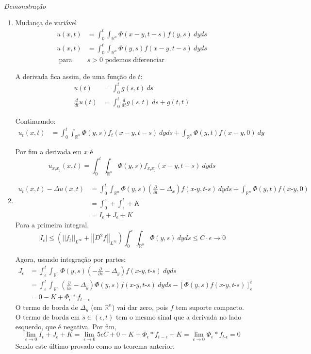 \documentclass[11pt]{article}
\newcommand{\Rn}{{\mathbb{R}^n}}
\newcommand{\p}{\partial}
\newcommand{\e}{\epsilon}
\newcommand{\pde}[2]{\frac{\p #1}{\p #2}}
\newcommand{\mi}{\text{-}}
\newcommand{\norm}[2]{\left|\left|#1\right|\right|_{L^{#2}}}
\begin{document}
\textit{Demonstração}\begin{enumerate}
	\item Mudança de variável \begin{align*}
		u(x,t)&=\int_0^t \int_\Rn \Phi(x-y,t-s) f(y,s)\ dy ds \\
		u(x,t)&=\int_0^t \int_\Rn \Phi(y,s) f(x-y,t-s)\ dy ds \\
		\text{ para } &s>0 \text{ podemos diferenciar }
	\end{align*}

	A derivada fica assim, de uma função de \(t\): \begin{align*}
		u(t) &= \int_0^t g(s,t)\ ds \\
		\frac{d}{dt}u(t) &= \int_0^t \frac{d}{dt}g(s,t)\ ds + g(t,t)
	\end{align*}

	Continuando: \begin{align*}
		u_t(x,t)&=\int_0^t \int_\Rn \Phi(y,s) f_t(x-y,t-s)\ dy ds + \int_\Rn \Phi(y,t) f(x-y,0)\ dy
	\end{align*}

	Por fim a derivada em \(x\) é \[u_{x_ix_j}(x,t)=\int_0^t \int_\Rn \Phi(y,s) f_{x_ix_j}(x-y,t-s)\ dy ds\]
	\item \begin{align*}
		u_t(x,t) - \Delta u(x,t) &= \int_0^t \int_\Rn \Phi(y,s) \left( \pde{}{t} - \Delta_x \right)f(x\mi y,t\mi s)\ dy ds + \int_\Rn \Phi(y,t) f(x\mi y,0)\\
		&= \int_0^\e + \int_\e^t  + K \\
		&= I_\e + J_\e + K
	\end{align*}
	Para a primeira integral,
	\[|I_\e| \leq \left( \norm{f_t}{\infty} + \norm{D^2f}{\infty} \right)\int_0^\e  \int_\Rn \Phi(y,s)\ dy ds \leq C \cdot \e \rightarrow 0 \]
	
	Agora, usando integração por partes:
	\begin{align*}
		J_\e &= \int_\e^t \int_\Rn \Phi(y,s) \left(-\pde{}{s} -\Delta_y\right)f(x\mi y, t\mi s)\ dy ds \\
		&= \int_\e^t \int_\Rn \left(\pde{}{s} - \Delta_y\right) \Phi(y,s)f(x\mi y, t\mi s)\ dy ds - \left[ \Phi(y,s) f(x\mi y, t\mi s)\right]_\e^t\\
		&=0 -K + \Phi_\e * f_{t-\e}
	\end{align*}
	O termo de borda de \(\Delta_y\) (em \(\Rn\)) vai dar zero, pois \(f\) tem suporte compacto. O termo de borda em \(s \in (\e, t)\) tem o mesmo sinal que a derivada no lado esquerdo, que é negativa.
	Por fim,
	\[\lim_{\e \rightarrow 0} I_\e + J_\e + K = \lim_{\e \rightarrow 0} 5\e C  + 0 - K + \Phi_\e * f_{t-\e} + K =\lim_{\e \rightarrow 0} \Phi_\e * f_{t\mi \e} = 0 \]
	Sendo este último provado como no teorema anterior.
	

\end{enumerate}
\end{document}

